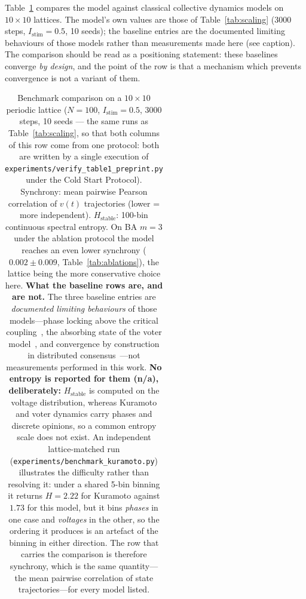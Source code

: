 ﻿\documentclass[11pt]{article}
\begin{document}
Table~\ref{tab:benchmarks} compares the model against classical collective dynamics models on $10 \times 10$ lattices. The model's own values are those of Table~\ref{tab:scaling} (3000 steps, $I_{\text{stim}} = 0.5$, 10 seeds); the baseline entries are the documented limiting behaviours of those models rather than measurements made here (see caption). The comparison should be read as a positioning statement: these baselines converge \emph{by design}, and the point of the row is that a mechanism which prevents convergence is not a variant of them.

\begin{table}[ht]
\centering
\caption{Benchmark comparison on a $10\times10$ periodic lattice ($N = 100$, $I_\mathrm{stim} = 0.5$, 3000 steps, 10 seeds --- the same runs as Table~\ref{tab:scaling}, so that both columns of this row come from one protocol: both are written by a single execution of \texttt{experiments/verify\_table1\_preprint.py} under the Cold Start Protocol). Synchrony: mean pairwise Pearson correlation of $v(t)$ trajectories (lower = more independent). $H_{\text{stable}}$: 100-bin continuous spectral entropy. On BA $m=3$ under the ablation protocol the model reaches an even lower synchrony ($0.002 \pm 0.009$, Table~\ref{tab:ablations}), the lattice being the more conservative choice here. \textbf{What the baseline rows are, and are not.} The three baseline entries are \emph{documented limiting behaviours} of those models---phase locking above the critical coupling~\cite{acebrn2005}, the absorbing state of the voter model~\cite{castellano2009}, and convergence by construction in distributed consensus~\cite{olfati2007}---not measurements performed in this work. \textbf{No entropy is reported for them (n/a), deliberately:} $H_{\text{stable}}$ is computed on the voltage distribution, whereas Kuramoto and voter dynamics carry phases and discrete opinions, so a common entropy scale does not exist. An independent lattice-matched run (\texttt{experiments/benchmark\_kuramoto.py}) illustrates the difficulty rather than resolving it: under a shared 5-bin binning it returns $H = 2.22$ for Kuramoto against $1.73$ for this model, but it bins \emph{phases} in one case and \emph{voltages} in the other, so the ordering it produces is an artefact of the binning in either direction. The row that carries the comparison is therefore synchrony, which is the same quantity---the mean pairwise correlation of state trajectories---for every model listed.}
\label{tab:benchmarks}
\begin{tabular}{lccc}
\toprule

\end{tabular}
\end{table}
\end{document}
